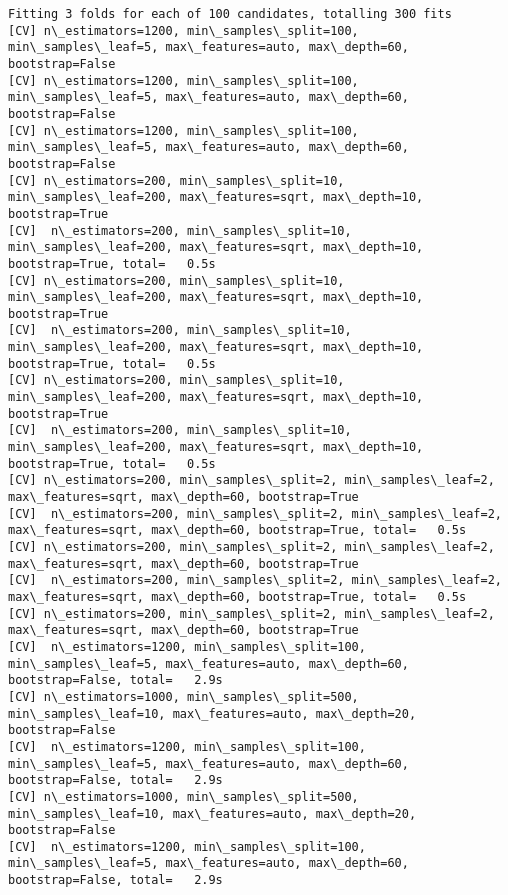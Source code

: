 \documentclass[11pt]{article}
\begin{document}
    \begin{Verbatim}[commandchars=\\\{\}]
Fitting 3 folds for each of 100 candidates, totalling 300 fits
[CV] n\_estimators=1200, min\_samples\_split=100, min\_samples\_leaf=5, max\_features=auto, max\_depth=60, bootstrap=False 
[CV] n\_estimators=1200, min\_samples\_split=100, min\_samples\_leaf=5, max\_features=auto, max\_depth=60, bootstrap=False 
[CV] n\_estimators=1200, min\_samples\_split=100, min\_samples\_leaf=5, max\_features=auto, max\_depth=60, bootstrap=False 
[CV] n\_estimators=200, min\_samples\_split=10, min\_samples\_leaf=200, max\_features=sqrt, max\_depth=10, bootstrap=True 
[CV]  n\_estimators=200, min\_samples\_split=10, min\_samples\_leaf=200, max\_features=sqrt, max\_depth=10, bootstrap=True, total=   0.5s
[CV] n\_estimators=200, min\_samples\_split=10, min\_samples\_leaf=200, max\_features=sqrt, max\_depth=10, bootstrap=True 
[CV]  n\_estimators=200, min\_samples\_split=10, min\_samples\_leaf=200, max\_features=sqrt, max\_depth=10, bootstrap=True, total=   0.5s
[CV] n\_estimators=200, min\_samples\_split=10, min\_samples\_leaf=200, max\_features=sqrt, max\_depth=10, bootstrap=True 
[CV]  n\_estimators=200, min\_samples\_split=10, min\_samples\_leaf=200, max\_features=sqrt, max\_depth=10, bootstrap=True, total=   0.5s
[CV] n\_estimators=200, min\_samples\_split=2, min\_samples\_leaf=2, max\_features=sqrt, max\_depth=60, bootstrap=True 
[CV]  n\_estimators=200, min\_samples\_split=2, min\_samples\_leaf=2, max\_features=sqrt, max\_depth=60, bootstrap=True, total=   0.5s
[CV] n\_estimators=200, min\_samples\_split=2, min\_samples\_leaf=2, max\_features=sqrt, max\_depth=60, bootstrap=True 
[CV]  n\_estimators=200, min\_samples\_split=2, min\_samples\_leaf=2, max\_features=sqrt, max\_depth=60, bootstrap=True, total=   0.5s
[CV] n\_estimators=200, min\_samples\_split=2, min\_samples\_leaf=2, max\_features=sqrt, max\_depth=60, bootstrap=True 
[CV]  n\_estimators=1200, min\_samples\_split=100, min\_samples\_leaf=5, max\_features=auto, max\_depth=60, bootstrap=False, total=   2.9s
[CV] n\_estimators=1000, min\_samples\_split=500, min\_samples\_leaf=10, max\_features=auto, max\_depth=20, bootstrap=False 
[CV]  n\_estimators=1200, min\_samples\_split=100, min\_samples\_leaf=5, max\_features=auto, max\_depth=60, bootstrap=False, total=   2.9s
[CV] n\_estimators=1000, min\_samples\_split=500, min\_samples\_leaf=10, max\_features=auto, max\_depth=20, bootstrap=False 
[CV]  n\_estimators=1200, min\_samples\_split=100, min\_samples\_leaf=5, max\_features=auto, max\_depth=60, bootstrap=False, total=   2.9s

\end{Verbatim}
\end{document}
